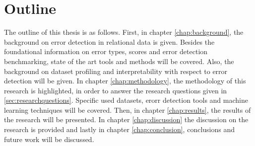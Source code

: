 \section{Outline}
\label{sec:outline}
The outline of this thesis is as follows. 
First, in chapter \ref{chap:background}, the background on error detection in relational data is given. Besides the foundational information on error types, scores and error detection benchmarking, state of the art tools and methods will be covered. Also, the background on dataset profiling and interpretability with respect to error detection will be given. 
In chapter \ref{chap:methodology}, the methodology of this research is highlighted, in order to answer the research questions given in \ref{sec:researchquestions}. Specific used datasets, erorr detection tools and machine learning techniques will be covered.
Then, in chapter \ref{chap:results}, the results of the research will be presented. 
In chapter \ref{chap:discussion} the discussion on the research is provided and lastly in chapter \ref{chap:conclusion}, conclusions and future work will be discussed.